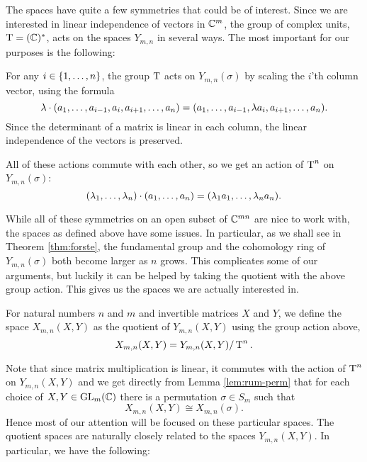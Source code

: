 The spaces have quite a few symmetries that could be of interest.
Since we are interested in linear independence of vectors in $\mathbb{C}^m$,
the group of complex units, $\operatorname{T}=(\mathbb{C})^*$, acts on the spaces $Y_{m,n}$
in several ways. The 
most important for our purposes is the following:
\begin{definition}
  For any $i \in \left\{ 1,\dots,n \right\}$, the group $\operatorname{T}$ acts
  on $Y_{m,n}(\sigma)$ by scaling the $i$'th column vector,
  using the formula
  \[ \lambda \cdot (a_1,\dots,a_{i-1},a_i,a_{i+1},\dots,a_n) =
  (a_1,\dots,a_{i-1},\lambda a_i,a_{i+1},\dots,a_n). \]
  Since the determinant of a matrix is linear in each column, the
  linear independence of the vectors is preserved.

  All of these actions commute with each other, so we get an action of
  $\operatorname{T}^n$ on $Y_{m,n}(\sigma)$:
  \[ (\lambda_1,\dots,\lambda_n) \cdot (a_1,\dots,a_n) = (\lambda_1 a_1,\dots, \lambda_n
  a_n). \]
\end{definition}

While all of these symmetries on an open subset of $\mathbb{C}^{mn}$ are nice
to work with, the spaces as defined above have some issues. In
particular, as we shall see in Theorem \ref{thm:forste}, the
fundamental group and the cohomology ring of
$Y_{m,n}(\sigma)$ both become larger as $n$ grows. This complicates
some of our arguments, but luckily it can be helped by taking the
quotient with the above group action. This gives us the spaces we are
actually interested in.

\begin{definition}
  For natural numbers $n$ and $m$ and invertible matrices $X$ and $Y$,
  we define the space $X_{m,n}(X,Y)$ as the quotient of $Y_{m,n}(X,Y)$
  using the group action above,
  \[ X_{m,n}(X,Y) = Y_{m,n}(X,Y) / \operatorname{T}^n. \]
\end{definition}

Note that since matrix multiplication is linear, it commutes with the
action of $\operatorname{T}^n$ on $Y_{m,n}(X,Y)$ and we get directly from Lemma
\ref{lem:rum-perm} that for each choice of $X,Y\in \mathrm{GL}_m(\mathbb{C})$ there is
a permutation $\sigma \in S_m$ such that
\[ X_{m,n}(X,Y) \cong X_{m,n}(\sigma). \]
Hence most of our attention will be focused on these particular
spaces. The quotient spaces are naturally closely related to the
spaces $Y_{m,n}(X,Y)$. In particular, we have the following:

